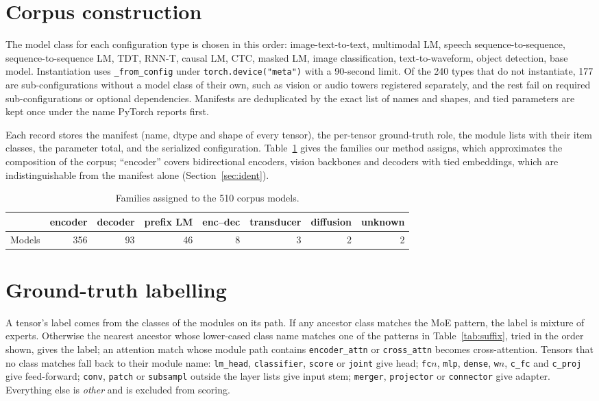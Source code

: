 \documentclass[11pt]{article}
\newcommand{\tn}[1]{\texttt{#1}}
\begin{document}
\section{Corpus construction}
\label{app:corpus}
The model class for each configuration type is chosen in this order: image-text-to-text, multimodal LM, speech sequence-to-sequence, sequence-to-sequence LM, TDT, RNN-T, causal LM, CTC, masked LM, image classification, text-to-waveform, object detection, base model. Instantiation uses \tn{\_from\_config} under \tn{torch.device("meta")} with a 90-second limit. Of the 240 types that do not instantiate, 177 are sub-configurations without a model class of their own, such as vision or audio towers registered separately, and the rest fail on required sub-configurations or optional dependencies. Manifests are deduplicated by the exact list of names and shapes, and tied parameters are kept once under the name PyTorch reports first.

Each record stores the manifest (name, dtype and shape of every tensor), the per-tensor ground-truth role, the module lists with their item classes, the parameter total, and the serialized configuration. Table~\ref{tab:families} gives the families our method assigns, which approximates the composition of the corpus; ``encoder'' covers bidirectional encoders, vision backbones and decoders with tied embeddings, which are indistinguishable from the manifest alone (Section~\ref{sec:ident}).

\begin{table}[h]
\centering
\small
\begin{tabular}{lrrrrrrr}
\toprule
& encoder & decoder & prefix LM & enc--dec & transducer & diffusion & unknown \\
\midrule
Models & 356 & 93 & 46 & 8 & 3 & 2 & 2 \\
\bottomrule
\end{tabular}
\caption{Families assigned to the 510 corpus models.}
\label{tab:families}
\end{table}

\section{Ground-truth labelling}
\label{app:gt}
A tensor's label comes from the classes of the modules on its path. If any ancestor class matches the MoE pattern, the label is mixture of experts. Otherwise the nearest ancestor whose lower-cased class name matches one of the patterns in Table~\ref{tab:suffix}, tried in the order shown, gives the label; an attention match whose module path contains \tn{encoder\_attn} or \tn{cross\_attn} becomes cross-attention. Tensors that no class matches fall back to their module name: \tn{lm\_head}, \tn{classifier}, \tn{score} or \tn{joint} give head; \tn{fc$n$}, \tn{mlp}, \tn{dense}, \tn{w$n$}, \tn{c\_fc} and \tn{c\_proj} give feed-forward; \tn{conv}, \tn{patch} or \tn{subsampl} outside the layer lists give input stem; \tn{merger}, \tn{projector} or \tn{connector} give adapter. Everything else is \emph{other} and is excluded from scoring.
\end{document}
